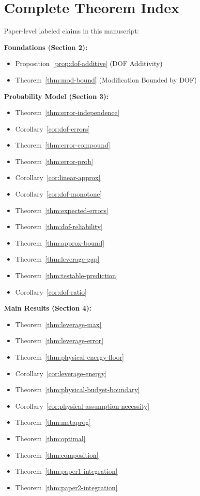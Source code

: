 \section{Complete Theorem Index}\label{appendix-theorems}

Paper-level labeled claims in this manuscript:

\textbf{Foundations (Section 2):}
\begin{itemize}
\item Proposition~\ref{prop:dof-additive} (DOF Additivity)
\item Theorem~\ref{thm:mod-bound} (Modification Bounded by DOF)
\end{itemize}

\textbf{Probability Model (Section 3):}
\begin{itemize}
\item Theorem~\ref{thm:error-independence}
\item Corollary~\ref{cor:dof-errors}
\item Theorem~\ref{thm:error-compound}
\item Theorem~\ref{thm:error-prob}
\item Corollary~\ref{cor:linear-approx}
\item Corollary~\ref{cor:dof-monotone}
\item Theorem~\ref{thm:expected-errors}
\item Theorem~\ref{thm:dof-reliability}
\item Theorem~\ref{thm:approx-bound}
\item Theorem~\ref{thm:leverage-gap}
\item Theorem~\ref{thm:testable-prediction}
\item Corollary~\ref{cor:dof-ratio}
\end{itemize}

\textbf{Main Results (Section 4):}
\begin{itemize}
\item Theorem~\ref{thm:leverage-max}
\item Theorem~\ref{thm:leverage-error}
\item Theorem~\ref{thm:physical-energy-floor}
\item Corollary~\ref{cor:leverage-energy}
\item Theorem~\ref{thm:physical-budget-boundary}
\item Corollary~\ref{cor:physical-assumption-necessity}
\item Theorem~\ref{thm:metaprog}
\item Theorem~\ref{thm:optimal}
\item Theorem~\ref{thm:composition}
\item Theorem~\ref{thm:paper1-integration}
\item Theorem~\ref{thm:paper2-integration}
\end{itemize}

